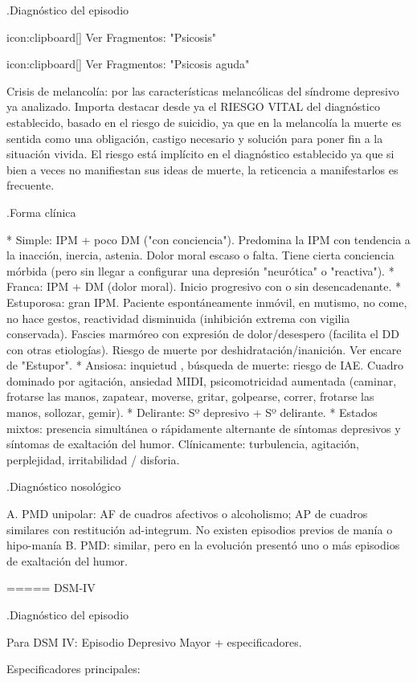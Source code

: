 \documentclass[encares.tex]{subfiles}
\begin{document}
.Diagnóstico del episodio

icon:clipboard[] Ver Fragmentos: "Psicosis"

icon:clipboard[] Ver Fragmentos: "Psicosis aguda"

Crisis de melancolía: por las características melancólicas del síndrome depresivo ya analizado. Importa destacar desde ya el RIESGO VITAL del diagnóstico establecido, basado en el riesgo de suicidio, ya que en la melancolía la muerte es sentida como una obligación, castigo necesario y solución para poner fin a la situación vivida. El riesgo está implícito en el diagnóstico establecido ya que si bien a veces no manifiestan sus ideas de muerte, la reticencia a manifestarlos es frecuente.

.Forma clínica

* Simple: IPM + poco DM ("con conciencia"). Predomina la IPM con tendencia a la inacción, inercia, astenia. Dolor moral escaso o falta. Tiene cierta conciencia mórbida (pero sin llegar a configurar una depresión "neurótica" o "reactiva").
* Franca: IPM + DM (dolor moral). Inicio progresivo con o sin desencadenante.
* Estuporosa: gran IPM. Paciente espontáneamente inmóvil, en mutismo, no come, no hace gestos, reactividad disminuida (inhibición extrema con vigilia conservada). Fascies marmóreo con expresión de dolor/desespero (facilita el DD con otras etiologías). Riesgo de muerte por deshidratación/inanición. Ver encare de "Estupor".
* Ansiosa: inquietud , búsqueda de muerte: riesgo de IAE. Cuadro dominado por agitación, ansiedad MIDI, psicomotricidad aumentada (caminar, frotarse las manos, zapatear, moverse, gritar, golpearse, correr, frotarse las manos, sollozar, gemir).
* Delirante: Sº depresivo + Sº delirante.
* Estados mixtos: presencia simultánea o rápidamente alternante de síntomas depresivos y síntomas de exaltación del humor. Clínicamente: turbulencia, agitación, perplejidad, irritabilidad / disforia.

.Diagnóstico nosológico

A. PMD unipolar: AF de cuadros afectivos o alcoholismo; AP de cuadros similares con restitución ad-integrum. No existen episodios previos de manía o hipo-manía
B. PMD: similar, pero en la evolución presentó uno o más episodios de exaltación del humor.

===== DSM-IV

.Diagnóstico del episodio

Para DSM IV: Episodio Depresivo Mayor + especificadores.

Especificadores principales:
\end{document}
